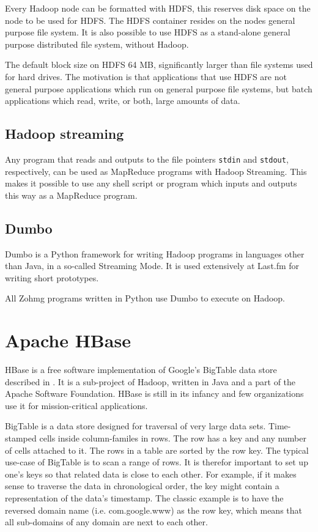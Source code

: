 \documentclass[a4paper,10pt]{book}
\begin{document}
Every Hadoop node can be formatted with HDFS, this reserves disk space on
the node to be used for HDFS. The HDFS container resides on the nodes
general purpose file system. It is also possible to use HDFS as a
stand-alone general purpose distributed file system, without Hadoop.

The default block size on HDFS 64 MB, significantly larger than
file systems used for hard drives. The motivation is that applications
that use HDFS are not general purpose applications which run on general
purpose file systems, but batch applications which read, write, or both,
large amounts of data.


\subsection{Hadoop streaming}

Any program that reads and outputs to the file pointers \texttt{stdin} and
\texttt{stdout}, respectively, can be used as MapReduce programs with
Hadoop Streaming. This makes it possible to use any shell script or
program which inputs and outputs this way as a MapReduce program.


\subsection{Dumbo}

Dumbo is a Python framework for writing Hadoop programs in languages other than
Java, in a so-called Streaming Mode. It is used extensively at Last.fm for
writing short prototypes. \cite{dumbo}

All Zohmg programs written in Python use Dumbo to execute on Hadoop.



\section{Apache HBase}

HBase is a free software implementation of Google's BigTable data store
described in \cite{bigtable}. It is a sub-project of Hadoop, written in
Java and a part of the Apache Software Foundation. HBase is still in its
infancy and few organizations use it for mission-critical applications.
\cite{hbase}

BigTable is a data store designed for traversal of very large data sets.
Time-stamped cells inside column-familes in rows. The row has a key and
any number of cells attached to it. The rows in a table are sorted by the
row key.  The typical use-case of BigTable is to scan a range of rows. It
is therefor important to set up one's keys so that related data is close
to each other. For example, if it makes sense to traverse the data in
chronological order, the key might contain a representation of the data's
timestamp. The classic example is to have the reversed domain name (i.e.
com.google.www) as the row key, which means that all sub-domains of any
domain are next to each other.
\end{document}
